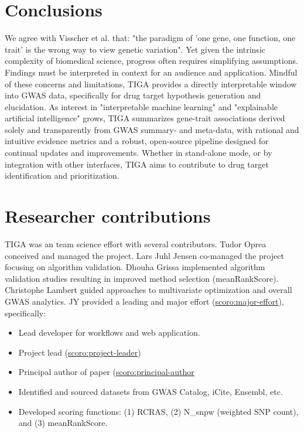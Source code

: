 \section{Conclusions}

We agree with Visscher et al. that: "the paradigm of 'one gene, one function, one trait' is the wrong way to view genetic variation"\cite{Visscher2017-jp}. Yet given the intrinsic complexity of biomedical science, progress often requires simplifying assumptions. Findings must be interpreted in context for an audience and application. Mindful of these concerns and limitations, TIGA provides a directly interpretable window into GWAS data, specifically for drug target hypothesis generation and elucidation. As interest in "interpretable machine learning" and "explainable artificial intelligence"\cite{Gilpin2018-da} grows, TIGA summarizes gene-trait associations derived solely and transparently from GWAS summary- and meta-data, with rational and intuitive evidence metrics and a robust, open-source pipeline designed for continual updates and improvements. Whether in stand-alone mode, or by integration with other interfaces, TIGA aims to contribute to drug target identification and prioritization. 


\section{Researcher contributions}

TIGA was an team science effort with several contributors. Tudor Oprea conceived and managed the project. Lars Juhl Jensen co-managed the project focusing on algorithm validation. Dhouha Grissa implemented algorithm validation studies resulting in improved method selection (meanRankScore). Christophe Lambert guided approaches to multivariate optimization and overall GWAS analytics. JY provided a leading and major effort (\href{http://purl.org/spar/scoro/major-effort}{scoro:major-effort}), specifically:

\begin{itemize}[topsep=0pt,itemsep=0pt,partopsep=0pt,parsep=0pt]
    \item Lead developer for workflows and web application.
    \item Project lead (\href{http://purl.org/spar/scoro/project-leader}{scoro:project-leader})
    \item Principal author of paper (\href{http://purl.org/spar/scoro/principal-author}{scoro:principal-author}
    \item Identified and sourced datasets from GWAS Catalog, iCite, Ensembl, etc.
    \item Developed scoring functions: (1) RCRAS, (2) N\_snpw (weighted SNP count), and (3) meanRankScore.
\end{itemize}

